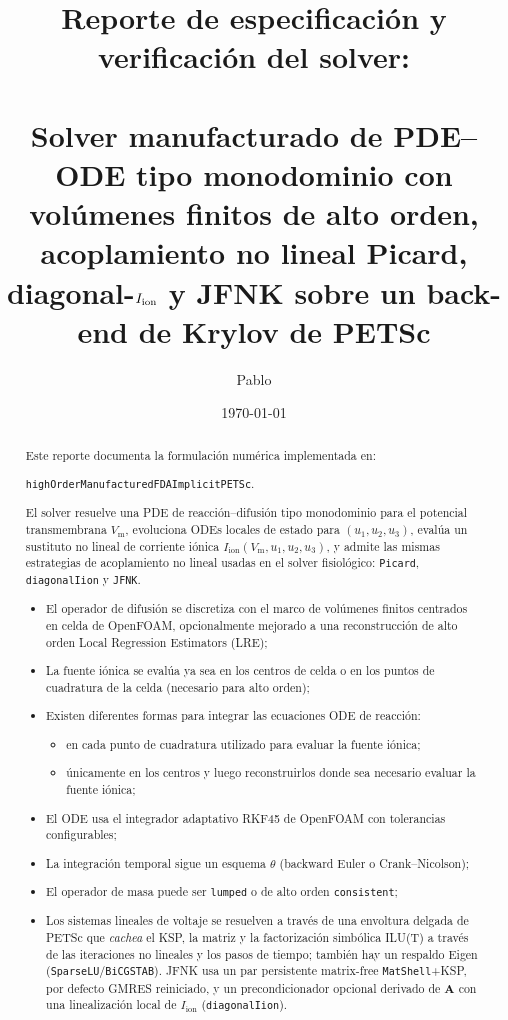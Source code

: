 \documentclass[11pt,a4paper]{article}
\title{Reporte de especificación y verificación del solver:\\
       \texorpdfstring{\code{highOrderManufacturedFDAImplicitPETSc}}{highOrderManufacturedFDAImplicitPETSc}\\
       \large Solver manufacturado de PDE--ODE tipo monodominio con volúmenes finitos de
       alto orden, acoplamiento no lineal Picard, diagonal-\texorpdfstring{$\Iion$}{Iion} y
       JFNK sobre un back-end de Krylov de PETSc}
\author{Pablo}
\date{\today}
\newcommand{\code}[1]{\texttt{\small #1}}
\newcommand{\Vm}{V_{\text{m}}}
\newcommand{\Iion}{I_{\mathrm{ion}}}
\newcommand{\Aimp}{\mathbf{A}}
\begin{document}
\maketitle

\begin{abstract}
Este reporte documenta la formulación numérica implementada en:

\begin{center}
\code{highOrderManufacturedFDAImplicitPETSc}.
\end{center}

El solver resuelve una PDE de reacción--difusión tipo monodominio para el
potencial transmembrana $\Vm$, evoluciona ODEs locales de estado para $(u_1,u_2,u_3)$,
evalúa un sustituto no lineal de corriente iónica $\Iion(\Vm,u_1,u_2,u_3)$, y admite las
mismas estrategias de acoplamiento no lineal usadas en el solver fisiológico:
\code{Picard}, \code{diagonalIion} y \code{JFNK}. 


\begin{itemize}
	\item El operador de difusión se
	discretiza con el marco de volúmenes finitos centrados en celda de OpenFOAM,
	opcionalmente mejorado a una reconstrucción de alto orden Local
	Regression Estimators (LRE);
	\item La fuente iónica se evalúa ya sea en los centros de
	celda o en los puntos de cuadratura de la celda (necesario para alto orden);
	\item Existen diferentes formas para integrar las ecuaciones ODE de reacción:
	\begin{itemize}
		\item[(i)] en cada punto de cuadratura utilizado para evaluar la fuente iónica;
		\item[(ii)] únicamente en los centros y luego reconstruirlos donde sea necesario evaluar la fuente iónica;
	\end{itemize}
	\item El ODE  usa el integrador adaptativo RKF45 de OpenFOAM con tolerancias
	configurables;
	\item La integración temporal sigue un esquema $\theta$ (backward Euler o Crank--Nicolson);
	\item El operador de masa puede ser \code{lumped} o de alto orden \code{consistent};
	\item Los sistemas lineales de voltaje se resuelven a través de una
	envoltura delgada de PETSc que \emph{cachea} el KSP, la matriz y la factorización simbólica
	ILU(T) a través de las iteraciones no lineales y los pasos de tiempo; también hay un
	respaldo Eigen (\code{SparseLU}/\code{BiCGSTAB}). JFNK usa un par persistente matrix-free
	\code{MatShell}+KSP, por defecto GMRES reiniciado, y un precondicionador opcional derivado
	de $\Aimp$ con una linealización local de $\Iion$ (\code{diagonalIion}).
\end{itemize}


\end{abstract}
\end{document}

